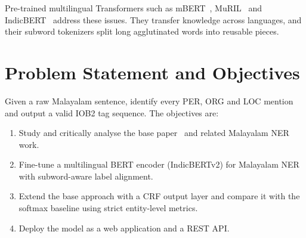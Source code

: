 Pre-trained multilingual Transformers such as mBERT~\cite{devlin2019bert},
MuRIL~\cite{khanuja2021muril} and IndicBERT~\cite{kakwani2020indicnlpsuite,
doddapaneni2023towards} address these issues. They transfer knowledge across
languages, and their subword tokenizers split long agglutinated words into
reusable pieces.

\section{Problem Statement and Objectives}

Given a raw Malayalam sentence, identify every PER, ORG and LOC mention and
output a valid IOB2 tag sequence. The objectives are:
\begin{enumerate}
  \item Study and critically analyse the base paper~\cite{mohan2023finetuned}
  and related Malayalam NER work.
  \item Fine-tune a multilingual BERT encoder (IndicBERTv2) for Malayalam NER
  with subword-aware label alignment.
  \item Extend the base approach with a CRF output layer and compare it with
  the softmax baseline using strict entity-level metrics.
  \item Deploy the model as a web application and a REST API.
\end{enumerate}
